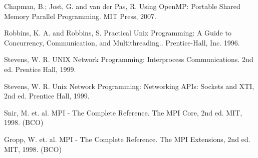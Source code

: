 {{        Chapman, B.; Jost, G. and van der Pas, R. Using OpenMP: Portable Shared Memory Parallel Programming. MIT Press, 2007.

        Robbins, K. A. and Robbins, S. Practical Unix Programming: A Guide to Concurrency, Communication, and Multithreading.. Prentice-Hall, Inc. 1996.

        Stevens, W. R. UNIX Network Programming: Interprocess Communications. 2nd ed. Prentice Hall, 1999.

        Stevens, W. R. Unix Network Programming: Networking APIs: Sockets and XTI, 2nd ed. Prentice Hall, 1999.

        Snir, M. et. al. MPI - The Complete Reference. The MPI Core, 2nd ed. MIT, 1998. (BCO)

        Gropp, W. et. al. MPI - The Complete Reference. The MPI Extensions, 2nd ed. MIT, 1998. (BCO)
    }
}